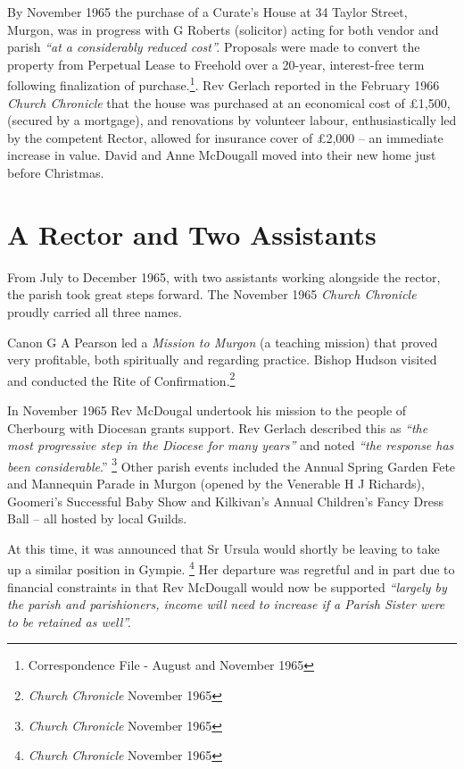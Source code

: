 By November 1965 the purchase of a Curate's House at 34 Taylor Street, Murgon, was in progress with G Roberts (solicitor) acting for both vendor and parish \emph{``at a considerably reduced cost''.} Proposals were made to convert the property from Perpetual Lease to Freehold over a 20-year, interest-free term following finalization of purchase.\footnote{Correspondence File - August and November 1965}. Rev Gerlach reported in the February 1966 \emph{Church Chronicle} that the house was purchased at an economical cost of \pounds1,500, (secured by a mortgage), and renovations by volunteer labour, enthusiastically led by the competent Rector, allowed for insurance cover of \pounds2,000 -- an immediate increase in value. David and Anne McDougall moved into their new home just before Christmas.


\section{A Rector and Two Assistants}



From July to December 1965, with two assistants working alongside the rector, the parish took great steps forward. The November 1965 \emph{Church Chronicle} proudly carried all three names.



Canon G A Pearson led a \emph{Mission to Murgon} (a teaching mission) that proved very profitable, both spiritually and regarding practice. Bishop Hudson visited and conducted the Rite of Confirmation.\footnote{\emph{Church Chronicle} November 1965}


In November 1965 Rev McDougal undertook his mission to the people of Cherbourg with Diocesan grants support. Rev Gerlach described this as \emph{``the most progressive step in the Diocese for many years''} and noted \emph{``the response has been considerable}.'' \footnote{\emph{Church Chronicle} November 1965} Other parish events included the Annual Spring Garden Fete and Mannequin Parade in Murgon (opened by the Venerable H J Richards), Goomeri's Successful Baby Show and Kilkivan's Annual Children's Fancy Dress Ball -- all hosted by local Guilds.


At this time, it was announced that Sr Ursula would shortly be leaving to take up a similar position in Gympie. \footnote{\emph{Church Chronicle} November 1965} Her departure was regretful and in part due to financial constraints in that Rev McDougall would now be supported \emph{``largely by the parish and parishioners, income will need to increase if a Parish Sister were to be retained as well''.}


